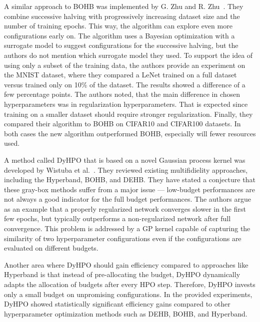 A similar approach to BOHB was implemented by G. Zhu and R. Zhu~\cite{zhu2020accelerating}. They combine successive halving with progressively increasing dataset size and the number of training epochs. This way, the algorithm can explore even more configurations early on. The algorithm uses a Bayesian optimization with a surrogate model to suggest configurations for the successive halving, but the authors do not mention which surrogate model they used. To support the idea of using only a subset of the training data, the authors provide an experiment on the MNIST dataset, where they compared a LeNet trained on a full dataset versus trained only on 10\% of the dataset. The results showed a difference of a few percentage points. The authors noted, that the main difference in chosen hyperparameters was in regularization hyperparameters. That is expected since training on a smaller dataset should require stronger regularization. Finally, they compared their algorithm to BOHB on CIFAR10 and CIFAR100 datasets. In both cases the new algorithm outperformed BOHB, especially will fewer resources used.



A method called DyHPO that is based on a novel Gaussian process kernel was developed by Wistuba et al.~\cite{wistuba2022supervising}. They reviewed existing multifidielity approaches, including the Hyperband, BOHB, and DEHB. They have stated a conjecture that these gray-box methods suffer from a major issue --- low-budget performances are not always a good indicator for the full budget performances. The authors argue as an example that a properly regularized network converges slower in the first few epochs, but typically outperforms a non-regularized network after full convergence. This problem is addressed by a GP kernel capable of capturing the similarity of two hyperparameter configurations even if the configurations are evaluated on different budgets.

Another area where DyHPO should gain efficiency compared to approaches like Hyperband is that instead of pre-allocating the budget, DyHPO dynamically adapts the allocation of budgets after every HPO step. Therefore, DyHPO invests only a small budget on unpromising configurations. In the provided experiments, DyHPO showed statistically significant efficiency gains compared to other hyperparameter optimization methods such as DEHB, BOHB, and Hyperband.



